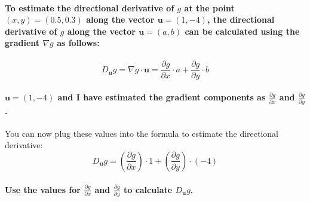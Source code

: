 \paragraph{To estimate the directional derivative of \(g\) at the point \((x, y) = (0.5, 0.3)\) along the vector \(\mathbf{u} = (1, -4)\), the directional derivative of \(g\) along the vector \(\mathbf{u} = (a, b)\) can be calculated using the gradient \(\nabla g\) as follows:}

\begin{equation}
    D_{\mathbf{u}} g = \nabla g \cdot \mathbf{u} = \frac{\partial g}{\partial x} \cdot a + \frac{\partial g}{\partial y} \cdot b
\end{equation}

\paragraph{\(\mathbf{u} = (1, -4)\) and I have estimated the gradient components as \(\frac{\partial g}{\partial x}\) and \(\frac{\partial g}{\partial y}\).}

You can now plug these values into the formula to estimate the directional derivative:
\begin{equation}
    D_{\mathbf{u}} g = \left(\frac{\partial g}{\partial x}\right) \cdot 1 + \left(\frac{\partial g}{\partial y}\right) \cdot (-4)
\end{equation}

\paragraph{Use the values for \(\frac{\partial g}{\partial x}\) and \(\frac{\partial g}{\partial y}\) to calculate \(D_{\mathbf{u}} g\).}
% 
% 
% 
% 
% 
% 
% 
% 
% 
% 
% 